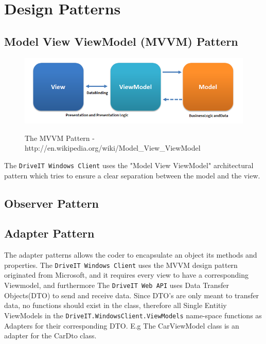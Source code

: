 \section{Design Patterns}
\subsection{Model View ViewModel (MVVM) Pattern}
\begin{figure}[H]
	\centering
	\includegraphics[scale=0.6]{Figures/WebImages/MVVMPattern}\\
	\caption{The MVVM Pattern - http://en.wikipedia.org/wiki/Model\_View\_ViewModel}
	\label{fig:MVVMPattern}
\end{figure}
The \texttt{DriveIT Windows Client} uses the "Model View ViewModel" architectural pattern which tries to ensure a clear separation between the model and the view. 
\subsection{Observer Pattern}

\subsection{Adapter Pattern}
The adapter patterns allows the coder to encapsulate an object its methods and properties. The \texttt{DriveIT Windows Client} uses the MVVM design pattern originated from Microsoft, and it requires every view to have a corresponding Viewmodel, and furthermore The \texttt{DriveIT Web API} uses Data Transfer Objects(DTO) to send and receive data. Since DTO's are only meant to transfer data, no functions should exist in the class, therefore all Single Entitiy ViewModels in the \texttt{DriveIT.WindowsClient.ViewModels} name-space functions as Adapters for their corresponding DTO. E.g The CarViewModel class is an adapter for the CarDto class.\\ 

